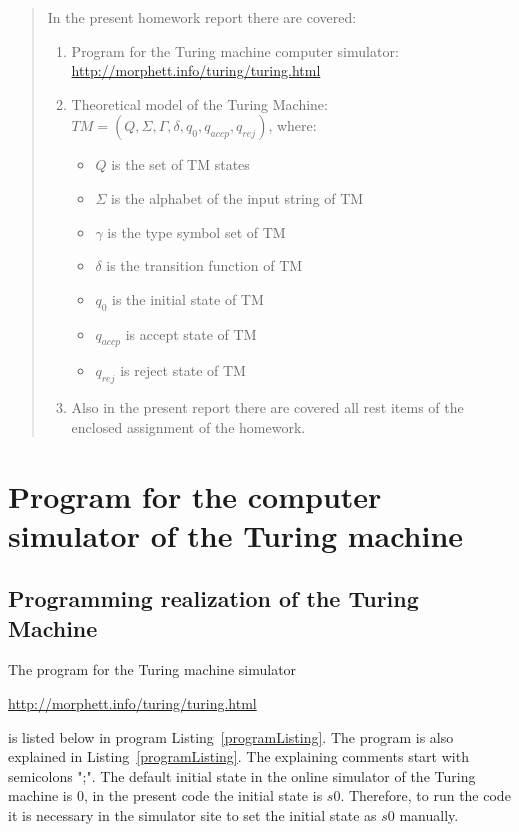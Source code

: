\documentclass[12pt, a4paper, bibliography=totocnumbered]{report}
\begin{document}
\newpage
\markboth{}{}
\vspace{-15cm}
\begin{abstract}
	In the present homework report there are covered:
	\begin{enumerate}
		\item Program for the Turing machine computer simulator: \url{http://morphett.info/turing/turing.html}
		\item Theoretical model of the Turing Machine: $ TM = (Q, \Sigma, \Gamma, \delta, q_{0}, q_{accp}, q_{rej}) $, 
		where: 
			\begin{itemize}
				\item $Q$  is the set of TM states
				\item $\Sigma$  is the alphabet of the input string of TM
				\item $\gamma$  is the type symbol set of TM
				\item $\delta$  is the transition function of TM
				\item $q_{0}$ is the initial state of TM
				\item $q_{accp}$ is accept state of TM
				\item $q_{rej}$  is reject state of TM
				\end{itemize}
		\item Also in the present report there are covered all rest items of the enclosed assignment of the homework.
		\end{enumerate}

	\end{abstract}
\newpage

\tableofcontents
{}


\newpage
\chapter{Program for the computer simulator of the Turing machine}
\section[]{Programming realization of the Turing Machine}

The program for the Turing machine simulator \cite{TuringSite} \vspace{-0.25cm}
{\center \url{http://morphett.info/turing/turing.html} \par}
\noindent
is listed below in program Listing~\ref{programListing}.
The program is also explained in Listing~\ref{programListing}. The explaining comments start with semicolons ";".
The default initial state in the online simulator of the Turing machine \cite{TuringSite} is $ 0 $, in the present code the initial state is $ s0 $. Therefore, to run the code it is necessary in the simulator site \cite{TuringSite} to set the initial state as $ s0 $ manually.
\end{document}
